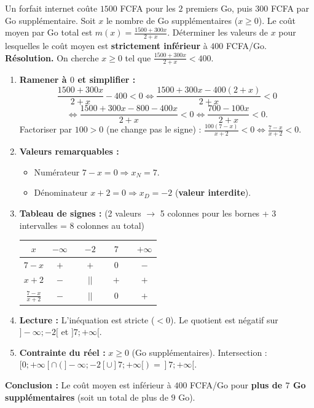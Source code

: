 \documentclass[11pt]{article}
\begin{document}
\begin{exoresolu}
    Un forfait internet coûte $1500$ FCFA pour les $2$ premiers Go, puis $300$ FCFA par Go supplémentaire. Soit $x$ le nombre de Go supplémentaires ($x \ge 0$). Le coût moyen par Go total est $m(x)=\frac{1500+300x}{2+x}$.
    Déterminer les valeurs de $x$ pour lesquelles le coût moyen est \textbf{strictement inférieur} à $400$ FCFA/Go.
    \tcblower
    \textbf{Résolution.}
    On cherche $x \ge 0$ tel que $\frac{1500+300x}{2+x} < 400$.
    \begin{enumerate}
        \item \textbf{Ramener à $0$ et simplifier :}
        \[\frac{1500+300x}{2+x} - 400 < 0 \iff \frac{1500+300x - 400(2+x)}{2+x} < 0\]
        \[\iff \frac{1500+300x - 800 - 400x}{2+x} < 0 \iff \frac{700 - 100x}{2+x} < 0.\]
        Factoriser par $100>0$ (ne change pas le signe) : $\frac{100(7 - x)}{x+2} < 0 \iff \frac{7 - x}{x+2} < 0$.
        \item \textbf{Valeurs remarquables :}
        \begin{itemize}
            \item Numérateur $7-x=0 \Rightarrow x_N = 7$.
            \item Dénominateur $x+2=0 \Rightarrow x_D = -2$ (\textbf{valeur interdite}).
        \end{itemize}
        \item \textbf{Tableau de signes :} (2 valeurs $\to$ 5 colonnes pour les bornes + 3 intervalles = 8 colonnes au total)
        \begin{center}
        \begin{tabular}{|c|ccccccc|}\hline
        $x$ & $-\infty$ & & $-2$ & & $7$ & & $+\infty$ \\ \hline
        $7-x$ & $+$ & & $+$ & & $0$ & & $-$ \\
        $x+2$ & $-$ & & $||$ & & $+$ & & $+$ \\ \hline
        $\frac{7-x}{x+2}$ & $-$ & & $||$ & & $0$ & & $+$ \\ \hline
        \end{tabular}
        \end{center}
        \item \textbf{Lecture :} L'inéquation est stricte ($<0$). Le quotient est négatif sur $]-\infty; -2[$ et $]7; +\infty[$.
        \item \textbf{Contrainte du réel :} $x \ge 0$ (Go supplémentaires).
        Intersection : $[0; +\infty[ \cap \left(]-\infty; -2[ \cup ]7; +\infty[\right) = ]7; +\infty[$.
    \end{enumerate}
    \textbf{Conclusion :} Le coût moyen est inférieur à $400$ FCFA/Go pour \textbf{plus de $7$ Go supplémentaires} (soit un total de plus de $9$ Go).
\end{exoresolu}
\end{document}
